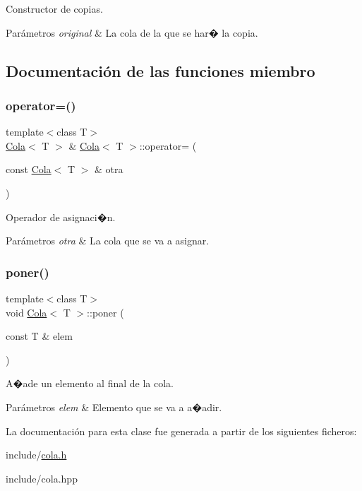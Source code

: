 Constructor de copias. 


\begin{DoxyParams}{Parámetros}
{\em original} & La cola de la que se har� la copia. \\
\hline
\end{DoxyParams}


\subsection{Documentación de las funciones miembro}
\mbox{\label{classCola_a2ac480681dec95b8ffeea075507849e2}} 
\subsubsection{\texorpdfstring{operator=()}{operator=()}}
{\footnotesize\ttfamily template$<$class T$>$ \\
\hyperlink{classCola}{Cola}$<$ T $>$ \& \hyperlink{classCola}{Cola}$<$ T $>$\+::operator= (\begin{DoxyParamCaption}\item[{const \hyperlink{classCola}{Cola}$<$ T $>$ \&}]{otra }\end{DoxyParamCaption})}



Operador de asignaci�n. 


\begin{DoxyParams}{Parámetros}
{\em otra} & La cola que se va a asignar. \\
\hline
\end{DoxyParams}
\mbox{\label{classCola_a4a902e5805ae74f8d80c6f3267fd14c4}} 
\subsubsection{\texorpdfstring{poner()}{poner()}}
{\footnotesize\ttfamily template$<$class T$>$ \\
void \hyperlink{classCola}{Cola}$<$ T $>$\+::poner (\begin{DoxyParamCaption}\item[{const T \&}]{elem }\end{DoxyParamCaption})}



A�ade un elemento al final de la cola. 


\begin{DoxyParams}{Parámetros}
{\em elem} & Elemento que se va a a�adir. \\
\hline
\end{DoxyParams}


La documentación para esta clase fue generada a partir de los siguientes ficheros\+:\begin{DoxyCompactItemize}
\item 
include/\hyperlink{cola_8h}{cola.\+h}\item 
include/cola.\+hpp\end{DoxyCompactItemize}
